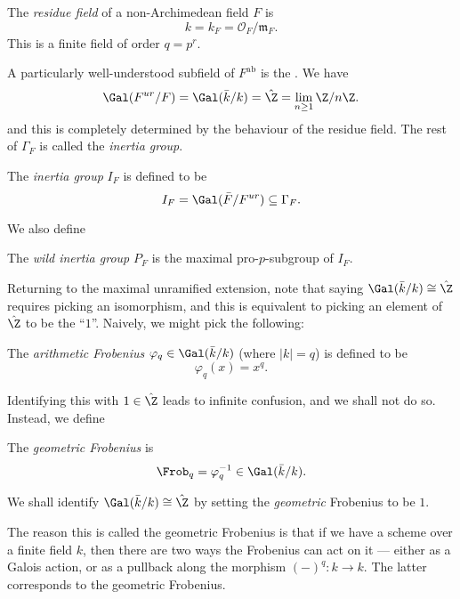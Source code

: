 \documentclass[a4paper]{article}
\newcommand\ab{\mathrm{ab}}
\begin{document}
\begin{defi}
  The \emph{residue field} of a non-Archimedean field $F$ is
  \[
    k = k_F = \mathcal{O}_F/\mathfrak{m}_F.
  \]
  This is a finite field of order $q = p^r$.
\end{defi}

A particularly well-understood subfield of $F^{\ab}$ is the  . We have
\[
  \Gal(F^{ur}/F) = \Gal(\bar{k}/k) = \hat{\Z} = \lim_{n \geq 1} \Z/n\Z.
\]
and this is completely determined by the behaviour of the residue field. The rest of $\Gamma_F$ is called the \emph{inertia group}.
\begin{defi}
  The \emph{inertia group} $I_F$ is defined to be
  \[
    I_F = \Gal(\bar{F}/F^{ur}) \subseteq \Gamma_F.
  \]
\end{defi}
We also define
\begin{defi}
  The \emph{wild inertia group} $P_F$ is the maximal pro-$p$-subgroup of $I_F$.
\end{defi}

Returning to the maximal unramified extension, note that saying $\Gal(\bar{k}/k) \cong \hat{\Z}$ requires picking an isomorphism, and this is equivalent to picking an element of $\hat{\Z}$ to be the ``$1$''. Naively, we might pick the following:
\begin{defi}
  The \emph{arithmetic Frobenius} $\varphi_q \in \Gal(\bar{k}/k)$ (where $|k| = q$) is defined to be
  \[
    \varphi_q(x) = x^q.
  \]
\end{defi}

Identifying this with $1 \in \hat{\Z}$ leads to infinite confusion, and we shall not do so. Instead, we define
\begin{defi}
  The \emph{geometric Frobenius} is
  \[
    \Frob_q = \varphi_q^{-1} \in \Gal(\bar{k}/k).
  \]
\end{defi}
We shall identify $\Gal(\bar{k}/k) \cong \hat{\Z}$ by setting the \emph{geometric} Frobenius to be $1$.

The reason this is called the geometric Frobenius is that if we have a scheme over a finite field $k$, then there are two ways the Frobenius can act on it --- either as a Galois action, or as a pullback along the morphism $(-)^q: k \to k$. The latter corresponds to the geometric Frobenius.
\end{document}
